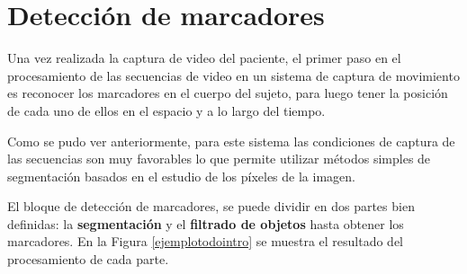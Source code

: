 \section{Detección de marcadores}
Una vez realizada la captura de video del paciente, el primer paso en el procesamiento de las secuencias de video en un sistema de captura de movimiento es reconocer los marcadores en el cuerpo del sujeto, para luego tener la posición de cada uno de ellos en el espacio y a lo largo del tiempo.

Como se pudo ver anteriormente, para este sistema las condiciones de captura de las secuencias son muy favorables lo que permite utilizar métodos simples de segmentación basados en el estudio de los píxeles de la imagen.

El bloque de detección de marcadores, se puede dividir en dos partes bien definidas: la \textbf{segmentación} y el \textbf{filtrado de objetos} hasta obtener los marcadores. En la Figura \ref{ejemplotodointro} se muestra el resultado del procesamiento de cada parte.

